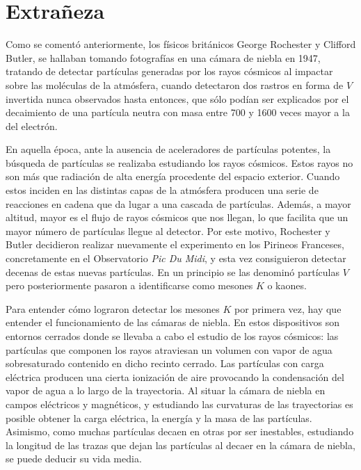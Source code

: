 \chapter{Extrañeza}\label{cap:strangeness}

Como se comentó anteriormente, los físicos británicos George Rochester y Clifford Butler, se hallaban tomando fotografías en una cámara de niebla en 1947, tratando de detectar partículas generadas por los rayos cósmicos al impactar sobre las moléculas de la atmósfera, cuando detectaron dos rastros en forma de $V$ invertida nunca observados hasta entonces, que sólo podían ser explicados por el decaimiento de una partícula neutra con masa entre 700 y 1600 veces mayor a la del electrón. 

En aquella época, ante la ausencia de aceleradores de partículas potentes, la búsqueda de partículas se realizaba estudiando los rayos cósmicos. Estos rayos no son más que radiación de alta energía procedente del espacio exterior. Cuando estos inciden en las distintas capas de la atmósfera producen una serie de reacciones en cadena que da lugar a una cascada de partículas. Además, a mayor altitud, mayor es el flujo de rayos cósmicos que nos llegan, lo que facilita que un mayor número de partículas llegue al detector. Por este motivo, Rochester y Butler decidieron realizar nuevamente el experimento en los Pirineos Franceses, concretamente en el Observatorio \textit{Pic Du Midi}, y esta vez consiguieron detectar decenas de estas nuevas partículas. En un principio se las denominó partículas $V$ pero posteriormente pasaron a identificarse como mesones $K$ o kaones. \cite{Griffiths2008}

Para entender cómo lograron detectar los mesones $K$ por primera vez, hay que entender el funcionamiento de las cámaras de niebla. En estos dispositivos son entornos cerrados donde se llevaba a cabo el estudio de los rayos cósmicos: las partículas que componen los rayos atraviesan un volumen con vapor de agua sobresaturado contenido en dicho recinto cerrado. Las partículas con carga eléctrica producen una cierta ionización de aire provocando la condensación del vapor de agua a lo largo de la trayectoria.  Al situar la cámara de niebla en campos eléctricos y magnéticos, y estudiando las curvaturas de las trayectorias es posible obtener la carga eléctrica, la energía y la masa de las partículas.  Asimismo, como muchas partículas decaen en otras por ser inestables, estudiando la longitud de las trazas que dejan las partículas al decaer en la cámara de niebla, se puede deducir su vida media. \cite{notas2020}\\

